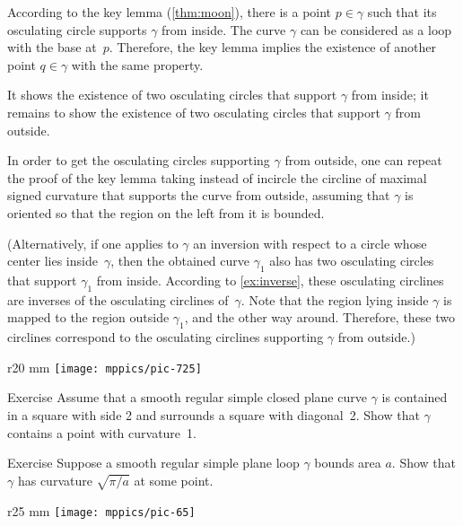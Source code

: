 According to the key lemma (\ref{thm:moon}), there is a point $p\in\gamma$ such that its osculating circle supports $\gamma$ from inside.
The curve $\gamma$ can be considered as a loop with the base at~$p$.
Therefore, the key lemma implies the existence of another point $q\in\gamma$ with the same property.

It shows the existence of two osculating circles that support $\gamma$ from inside;
it remains to show the existence of two osculating circles that support $\gamma$ from outside.

In order to get the osculating circles supporting $\gamma$ from outside, one can repeat the proof of the key lemma taking instead of incircle the circline of maximal signed curvature that supports the curve from outside, assuming that $\gamma$ is oriented so that the region on the left from it is bounded.

(Alternatively, if one applies to $\gamma$ an inversion with respect to a circle whose center lies inside~$\gamma$, then the obtained curve $\gamma_1$ also has  two osculating circles that support $\gamma_1$ from inside.
According to \ref{ex:inverse}, these osculating circlines are inverses of the osculating circlines of~$\gamma$.
Note that the region lying inside $\gamma$ is mapped to the region outside $\gamma_1$, and the other way around.
Therefore, these two circlines correspond to the osculating circlines supporting $\gamma$ from outside.)
\qeds

{

\begin{wrapfigure}{r}{20 mm}
\vskip-8mm
\centering
\texttt{[image: mppics/pic-725]}
\vskip0mm
\end{wrapfigure}

\begin{thm}{Exercise}\label{ex:2-squares}
Assume that a smooth regular simple closed plane curve \(\gamma\) is contained in a square with side 2 and surrounds a square with diagonal~2.
Show that \(\gamma\) contains a point with curvature~1.
\end{thm}

}

\begin{thm}{Exercise}\label{ex:moon-area}
Suppose a smooth regular simple plane loop $\gamma$ bounds area $a$.
Show that $\gamma$ has curvature $\sqrt{\pi/a}$ at some point.
\end{thm}

\begin{wrapfigure}[5]{r}{25 mm}
\vskip-7mm
\centering
\texttt{[image: mppics/pic-65]}
\vskip0mm
\end{wrapfigure}

